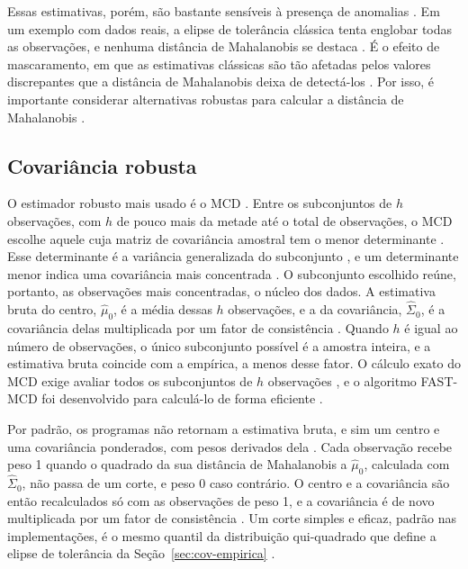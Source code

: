\documentclass{uflamon}          %
\begin{document}
Essas estimativas, porém, são bastante sensíveis à presença de anomalias \cite{campello2015}. Em um exemplo com dados reais, a elipse de tolerância clássica tenta englobar todas as observações, e nenhuma distância de Mahalanobis se destaca \cite{hubert2010}. É o efeito de mascaramento, em que as estimativas clássicas são tão afetadas pelos valores discrepantes que a distância de Mahalanobis deixa de detectá-los \cite{hubert2010}. Por isso, é importante considerar alternativas robustas para calcular a distância de Mahalanobis \cite{ghorbani2019}.

\subsection{Covariância robusta}
\label{sec:mcd}

O estimador robusto mais usado é o MCD . Entre os subconjuntos de $h$ observações, com $h$ de pouco mais da metade até o total de observações, o MCD escolhe aquele cuja matriz de covariância amostral tem o menor determinante \cite{hubert2010}. Esse determinante é a variância generalizada do subconjunto \cite{fauconnier2009}, e um determinante menor indica uma covariância mais concentrada \cite{hubert2010}. O subconjunto escolhido reúne, portanto, as observações mais concentradas, o núcleo dos dados. A estimativa bruta do centro, $\hat{\mu}_0$, é a média dessas $h$ observações, e a da covariância, $\hat{\Sigma}_0$, é a covariância delas multiplicada por um fator de consistência \cite{hubert2010}. Quando $h$ é igual ao número de observações, o único subconjunto possível é a amostra inteira, e a estimativa bruta coincide com a empírica, a menos desse fator. O cálculo exato do MCD exige avaliar todos os subconjuntos de $h$ observações \cite{hubert2010}, e o algoritmo FAST-MCD foi desenvolvido para calculá-lo de forma eficiente .

Por padrão, os programas não retornam a estimativa bruta, e sim um centro e uma covariância ponderados, com pesos derivados dela \cite{fauconnier2009}. Cada observação recebe peso 1 quando o quadrado da sua distância de Mahalanobis a $\hat{\mu}_0$, calculada com $\hat{\Sigma}_0$, não passa de um corte, e peso 0 caso contrário. O centro e a covariância são então recalculados só com as observações de peso 1, e a covariância é de novo multiplicada por um fator de consistência \cite{fauconnier2009}. Um corte simples e eficaz, padrão nas implementações, é o mesmo quantil da distribuição qui-quadrado que define a elipse de tolerância da Seção~\ref{sec:cov-empirica} \cite{hubert2010}.
\end{document}
